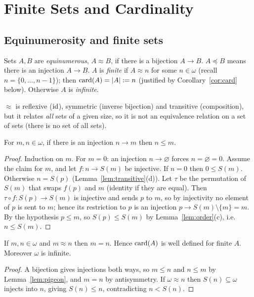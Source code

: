 \chapter{Finite Sets and Cardinality}\label{ch:finite}

\section{Equinumerosity and finite sets}

\begin{definition}
	Sets $A,B$ are \emph{equinumerous}, $A\approx B$, if there is a bijection $A\to B$. $A\preceq B$ means there is an injection $A\to B$. $A$ is \emph{finite} if $A\approx n$ for some $n\in\omega$ (recall $n=\{0,\dots,n-1\}$); then $\operatorname{card}(A)=|A|:=n$ (justified by Corollary~\ref{cor:card} below). Otherwise $A$ is \emph{infinite}.
\end{definition}

$\approx$ is reflexive ($\operatorname{id}$), symmetric (inverse bijection) and transitive (composition), but it relates \emph{all} sets of a given size, so it is not an equivalence relation on a set of sets (there is no set of all sets).

\begin{lemma}[Pigeonhole]\label{lem:pigeon}
	For $m,n\in\omega$, if there is an injection $n\to m$ then $n\le m$.
\end{lemma}
\begin{proof}
	Induction on $m$. For $m=0$: an injection $n\to\varnothing$ forces $n=\varnothing=0$. Assume the claim for $m$, and let $f:n\to S(m)$ be injective. If $n=0$ then $0\le S(m)$. Otherwise $n=S(p)$ (Lemma~\ref{lem:transitive}(d)). Let $\tau$ be the permutation of $S(m)$ that swaps $f(p)$ and $m$ (identity if they are equal). Then $\tau\circ f:S(p)\to S(m)$ is injective and sends $p$ to $m$, so by injectivity no element of $p$ is sent to $m$; hence its restriction to $p$ is an injection $p\to S(m)\setminus\{m\}=m$. By the hypothesis $p\le m$, so $S(p)\le S(m)$ by Lemma~\ref{lem:order}(c), i.e.\ $n\le S(m)$.
\end{proof}

\begin{corollary}\label{cor:card}
	If $m,n\in\omega$ and $m\approx n$ then $m=n$. Hence $\operatorname{card}(A)$ is well defined for finite $A$. Moreover $\omega$ is infinite.
\end{corollary}
\begin{proof}
	A bijection gives injections both ways, so $m\le n$ and $n\le m$ by Lemma~\ref{lem:pigeon}, and $m=n$ by antisymmetry. If $\omega\approx n$ then $S(n)\subseteq\omega$ injects into $n$, giving $S(n)\le n$, contradicting $n<S(n)$.
\end{proof}

